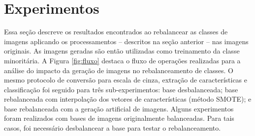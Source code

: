 %
%




\section{Experimentos}
\label{sec:resultados-geracao}

Essa seção descreve os resultados encontrados ao rebalancear as classes de imagens aplicando os processamentos -- descritos na seção anterior -- nas imagens originais. As imagens geradas são então utilizadas como treinamento da classe minoritária. A Figura \ref{fig:fluxo} destaca o fluxo de operações realizadas para a análise do impacto da geração de imagens no rebalanceamento de classes. O mesmo protocolo de conversão para escala de cinza, extração de características e classificação foi seguido para três sub-experimentos: base desbalanceada; base rebalanceada com interpolação dos vetores de características (método SMOTE); e base rebalanceada com a geração artificial de imagens. Alguns experimentos foram realizados com bases de imagens originalmente balanceadas. Para tais casos, foi necessário desbalancear a base para testar o rebalanceamento.

